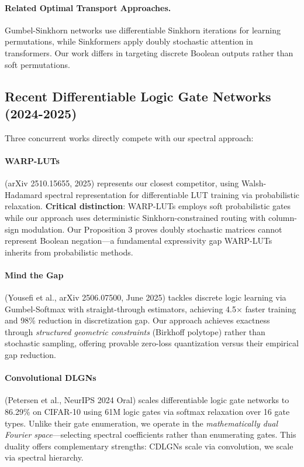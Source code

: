 \documentclass[Royal,times,sageh]{sagej}
\begin{document}
\paragraph{Related Optimal Transport Approaches.} Gumbel-Sinkhorn networks \cite{mena2018learning} use differentiable Sinkhorn iterations for learning permutations, while Sinkformers \cite{sander2022sinkformers} apply doubly stochastic attention in transformers. Our work differs in targeting discrete Boolean outputs rather than soft permutations.

\subsection{Recent Differentiable Logic Gate Networks (2024-2025)}

Three concurrent works directly compete with our spectral approach:

\paragraph{WARP-LUTs} (arXiv 2510.15655, 2025) represents our closest competitor, using Walsh-Hadamard spectral representation for differentiable LUT training via probabilistic relaxation. \textbf{Critical distinction}: WARP-LUTs employs soft probabilistic gates while our approach uses deterministic Sinkhorn-constrained routing with column-sign modulation. Our Proposition 3 proves doubly stochastic matrices cannot represent Boolean negation---a fundamental expressivity gap WARP-LUTs inherits from probabilistic methods.

\paragraph{Mind the Gap} (Yousefi et al., arXiv 2506.07500, June 2025) tackles discrete logic learning via Gumbel-Softmax with straight-through estimators, achieving 4.5$\times$ faster training and 98\% reduction in discretization gap. Our approach achieves exactness through \textit{structured geometric constraints} (Birkhoff polytope) rather than stochastic sampling, offering provable zero-loss quantization versus their empirical gap reduction.

\paragraph{Convolutional DLGNs} (Petersen et al., NeurIPS 2024 Oral) scales differentiable logic gate networks to 86.29\% on CIFAR-10 using 61M logic gates via softmax relaxation over 16 gate types. Unlike their gate enumeration, we operate in the \textit{mathematically dual Fourier space}---selecting spectral coefficients rather than enumerating gates. This duality offers complementary strengths: CDLGNs scale via convolution, we scale via spectral hierarchy.
\end{document}
